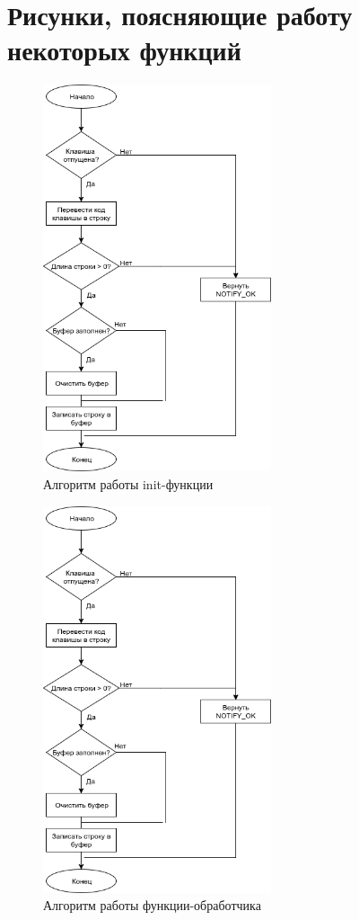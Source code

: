 \chapter{Рисунки, поясняющие работу некоторых функций}

\begin{figure}[h!]
	\centering
	\includegraphics[width=0.6\textwidth]{img/diagram3.png}
	\caption{Алгоритм работы init-функции}
	\label{fig:spire02}
\end{figure}
\begin{figure}[h!]
	\centering
	\includegraphics[width=0.6\textwidth]{img/diagram3.png}
	\caption{Алгоритм работы функции-обработчика}
	\label{fig:spire03}
\end{figure}
